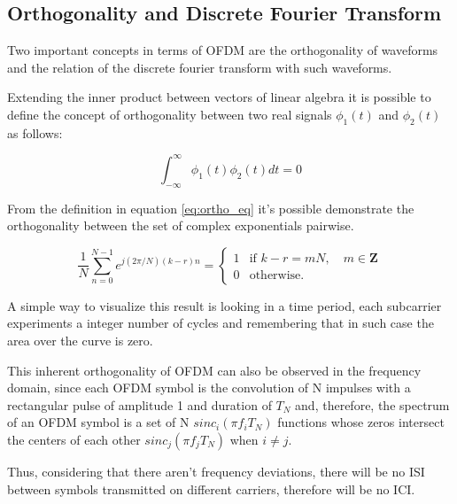 \subsection{Orthogonality and Discrete Fourier Transform}

Two important concepts in terms of OFDM are the orthogonality of waveforms and the relation of the discrete fourier transform with such waveforms. 

\par Extending the inner product between vectors of linear algebra it is possible to define the concept of orthogonality between two real signals $\phi_1(t)$ and $\phi_2(t)$ as follows:

\begin{equation} \label{eq:ortho_eq}
    \int_{-\infty}^{\infty} \phi_1(t)\phi_2(t)dt = 0
\end{equation}

\par From the definition in equation \ref{eq:ortho_eq} it's possible demonstrate the orthogonality between the set of complex exponentials pairwise. 

\begin{equation} \label{eq:ortho_exp_eq}
    \frac{1}{N}\sum_{n = 0}^{N-1} e^{j(2\pi/N)(k-r)n} =
    \left\{
	\begin{array}{ll}
		1  & \mbox{if } k-r = mN,  \quad m \in \mathbf{Z} \\
		0  & \mbox{otherwise. } 
	\end{array}
\right.
\end{equation}


\par A simple way to visualize this result is looking in a time period, each subcarrier experiments a integer number of cycles and remembering that in such case the area over the curve is zero. 

\par This inherent orthogonality of OFDM can also be observed in the frequency domain, since each OFDM symbol is the convolution of N impulses with a rectangular pulse of amplitude 1 and duration of $T_N$ and, therefore, the spectrum of an OFDM symbol is a set of N $sinc_i(\pi f_i T_N)$ functions whose zeros intersect the centers of each other  $sinc_j(\pi f_j T_N)$ when $i \neq j$.

\par Thus, considering that there aren't frequency deviations, there will be no ISI between symbols transmitted on different carriers, therefore will be no ICI.

